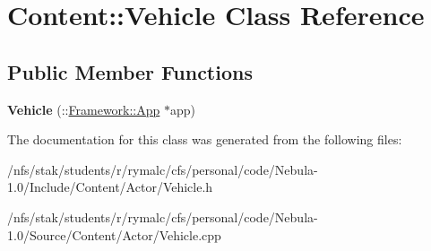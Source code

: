 \hypertarget{classContent_1_1Vehicle}{
\section{Content::Vehicle Class Reference}
\label{classContent_1_1Vehicle}
}
\subsection*{Public Member Functions}
\begin{DoxyCompactItemize}
\item 
\hypertarget{classContent_1_1Vehicle_a6ecbd40caf8464e1a45228c9184d4dd3}{
{\bfseries Vehicle} (::\hyperlink{classFramework_1_1App}{Framework::App} $\ast$app)}
\label{classContent_1_1Vehicle_a6ecbd40caf8464e1a45228c9184d4dd3}

\end{DoxyCompactItemize}


The documentation for this class was generated from the following files:\begin{DoxyCompactItemize}
\item 
/nfs/stak/students/r/rymalc/cfs/personal/code/Nebula-\/1.0/Include/Content/Actor/Vehicle.h\item 
/nfs/stak/students/r/rymalc/cfs/personal/code/Nebula-\/1.0/Source/Content/Actor/Vehicle.cpp\end{DoxyCompactItemize}
